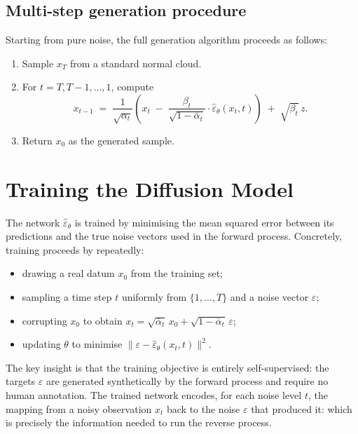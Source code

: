 \documentclass[11pt]{article}
\begin{document}
\subsection*{Multi-step generation procedure}

Starting from pure noise, the full generation algorithm proceeds as follows:
\begin{enumerate}
  \item Sample $x_T$ from a standard normal cloud.
  \item For $t = T, T-1, \ldots, 1$, compute
  \[
  x_{t-1}
  \;=\;
  \frac{1}{\sqrt{\alpha_t}}
  \!\left(
    x_t \;-\; \frac{\beta_t}{\sqrt{1-\bar{\alpha}_t}} \cdot \widehat{\varepsilon}_\theta(x_t,t)
  \right)
  \;+\;
  \sqrt{\beta_t}\, z.
  \]
  \item Return $x_0$ as the generated sample.
\end{enumerate}

\section{Training the Diffusion Model}

The network $\widehat{\varepsilon}_\theta$ is trained by minimising the mean squared error between its predictions and the true noise vectors used in the forward process.
Concretely, training proceeds by repeatedly:
\begin{itemize}
  \item drawing a real datum $x_0$ from the training set;
  \item sampling a time step $t$ uniformly from $\{1, \ldots, T\}$ and a noise vector $\varepsilon$;
  \item corrupting $x_0$ to obtain $x_t = \sqrt{\bar{\alpha}_t}\,x_0 + \sqrt{1-\bar{\alpha}_t}\,\varepsilon$;
  \item updating $\theta$ to minimise $\|\varepsilon - \widehat{\varepsilon}_\theta(x_t, t)\|^2$.
\end{itemize}

The key insight is that the training objective is entirely self-supervised: the targets $\varepsilon$ are generated synthetically by the forward process and require no human annotation.
The trained network encodes, for each noise level $t$, the mapping from a noisy observation $x_t$ back to the noise $\varepsilon$ that produced it: which is precisely the information needed to run the reverse process.
\end{document}
